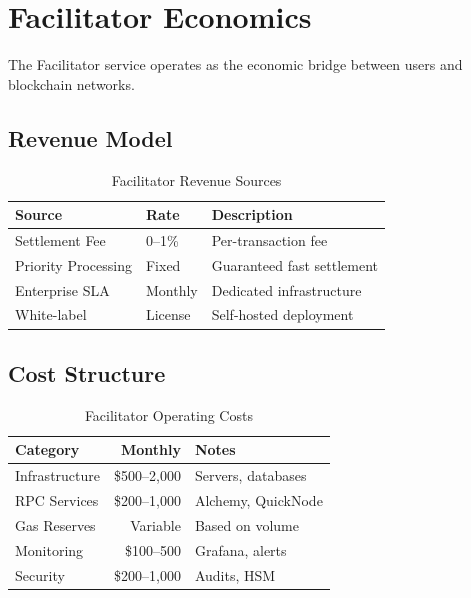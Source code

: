 \section{Facilitator Economics}
\label{sec:facilitator-economics}

The Facilitator service operates as the economic bridge between users and blockchain networks.

\subsection{Revenue Model}

\begin{table}[htbp]
\centering
\caption{Facilitator Revenue Sources}
\label{tab:facilitator-revenue}
\begin{tabular}{l l p{5cm}}
\toprule
\textbf{Source} & \textbf{Rate} & \textbf{Description} \\
\midrule
Settlement Fee & 0--1\% & Per-transaction fee \\
Priority Processing & Fixed & Guaranteed fast settlement \\
Enterprise SLA & Monthly & Dedicated infrastructure \\
White-label & License & Self-hosted deployment \\
\bottomrule
\end{tabular}
\end{table}

\subsection{Cost Structure}

\begin{table}[htbp]
\centering
\caption{Facilitator Operating Costs}
\label{tab:facilitator-costs}
\begin{tabular}{l r p{4.5cm}}
\toprule
\textbf{Category} & \textbf{Monthly} & \textbf{Notes} \\
\midrule
Infrastructure & \$500--2,000 & Servers, databases \\
RPC Services & \$200--1,000 & Alchemy, QuickNode \\
Gas Reserves & Variable & Based on volume \\
Monitoring & \$100--500 & Grafana, alerts \\
Security & \$200--1,000 & Audits, HSM \\
\bottomrule
\end{tabular}
\end{table}

